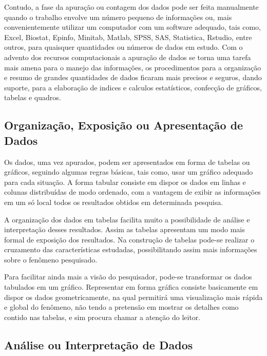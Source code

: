 Contudo, a fase da apuração ou contagem dos dados pode ser feita manualmente quando o trabalho envolve um número pequeno de
informações ou, mais convenientemente utilizar um computador com
um software adequado, tais como, Excel, Biostat, Epinfo, Minitab, Matlab,
SPSS, SAS, Statistica, Rstudio, entre outros, para quaisquer quantidades ou números de
dados em estudo. Com o advento dos recursos computacionais a
apuração de dados se torna uma tarefa mais amena para o manejo das
informações, os procedimentos para a organização e resumo de
grandes quantidades de dados ficaram mais precisos e seguros,
dando suporte, para a elaboração de indices e calculos
estatísticos, confecção de gráficos, tabelas e quadros.



\subsection{Organização, Exposição ou Apresentação de Dados}

\inic Os dados, uma vez apurados, podem ser apresentados em forma
de tabelas ou gráficos, seguindo algumas regras básicas,
tais como, usar um gráfico adequado para cada situação. A forma
tabular consiste em dispor os dados em linhas e colunas
distribuídas de modo ordenado, com a vantagem de exibir as
informações em um só local todos os resultados obtidos em
determinada pesquisa. 


A organização dos dados em tabelas facilita
muito a possibilidade de análise e interpretação desses
resultados. Assim as tabelas apresentam um modo mais formal de
exposição dos resultados. Na construção de tabelas pode-se
realizar o cruzamento das características estudadas,
possibilitando assim mais informações sobre o fenômeno
pesquisado.\vskip0.3cm

\inic Para facilitar ainda mais a visão do
pesquisador, pode-se transformar os dados
tabulados em um gráfico. Representar em forma
gráfica consiste basicamente em dispor os dados
geometricamente, na qual permitirá uma visualização
mais rápida e global do fenômeno, não tendo a pretensão
em mostrar os detalhes como contido nas tabelas, e sim
procura chamar a atenção do leitor.\vskip0.3cm


\subsection{Análise ou Interpretação de Dados}

